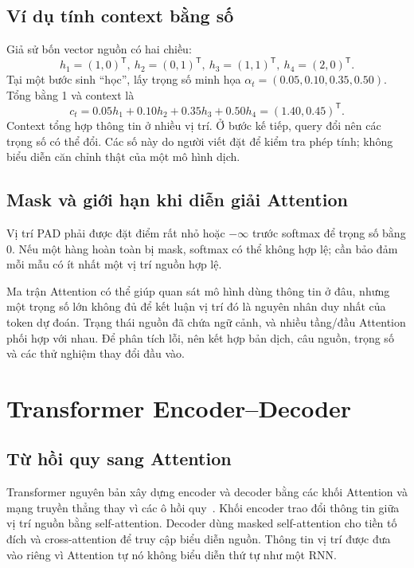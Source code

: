 \documentclass[11pt,a4paper]{article}
\numberwithin{equation}{section}
\begin{document}
\subsection{Ví dụ tính context bằng số}
Giả sử bốn vector nguồn có hai chiều:
\begin{equation*}
h_1=(1,0)^{\mathsf T},\ h_2=(0,1)^{\mathsf T},\
h_3=(1,1)^{\mathsf T},\ h_4=(2,0)^{\mathsf T}.
\end{equation*}
Tại một bước sinh ``học'', lấy trọng số minh họa $\alpha_t=(0.05,0.10,0.35,0.50)$. Tổng bằng 1 và context là
\begin{equation*}
c_t=0.05h_1+0.10h_2+0.35h_3+0.50h_4=(1.40,0.45)^{\mathsf T}.
\end{equation*}
Context tổng hợp thông tin ở nhiều vị trí. Ở bước kế tiếp, query đổi nên các trọng số có thể đổi. Các số này do người viết đặt để kiểm tra phép tính; không biểu diễn căn chỉnh thật của một mô hình dịch.

\subsection{Mask và giới hạn khi diễn giải Attention}
Vị trí PAD phải được đặt điểm rất nhỏ hoặc $-\infty$ trước softmax để trọng số bằng 0. Nếu một hàng hoàn toàn bị mask, softmax có thể không hợp lệ; cần bảo đảm mỗi mẫu có ít nhất một vị trí nguồn hợp lệ.

Ma trận Attention có thể giúp quan sát mô hình dùng thông tin ở đâu, nhưng một trọng số lớn không đủ để kết luận vị trí đó là nguyên nhân duy nhất của token dự đoán. Trạng thái nguồn đã chứa ngữ cảnh, và nhiều tầng/đầu Attention phối hợp với nhau. Để phân tích lỗi, nên kết hợp bản dịch, câu nguồn, trọng số và các thử nghiệm thay đổi đầu vào.

\clearpage
\section{Transformer Encoder--Decoder}
\subsection{Từ hồi quy sang Attention}
Transformer nguyên bản xây dựng encoder và decoder bằng các khối Attention và mạng truyền thẳng thay vì các ô hồi quy~\cite{vaswani}. Khối encoder trao đổi thông tin giữa vị trí nguồn bằng self-attention. Decoder dùng masked self-attention cho tiền tố đích và cross-attention để truy cập biểu diễn nguồn. Thông tin vị trí được đưa vào riêng vì Attention tự nó không biểu diễn thứ tự như một RNN.
\end{document}
